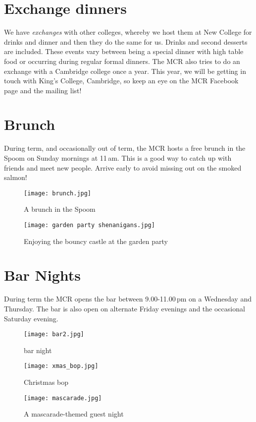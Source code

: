 \section{Exchange dinners}
We have \emph{exchanges} with other colleges, whereby we host them at New
College for drinks and dinner and then they do the same for us. Drinks and second desserts are included. These events vary between being a special dinner with high table food or occurring during regular formal dinners. The MCR also tries to do an exchange with a Cambridge college once a year. This year, we will be getting in touch with King's College, Cambridge, so keep an eye on the MCR Facebook page and the mailing list!

\section{Brunch}
During term, and occasionally out of term, the MCR hosts a free brunch in the
Spoom on Sunday mornings at 11\,am. This is a good way to catch up with friends and meet new people. Arrive early to avoid missing out on the smoked salmon!

\begin{figure}[htbp]
\centering
		\begin{minipage}{0.45\textwidth}
			\centering
				\texttt{[image: brunch.jpg]}
				\caption[]{A brunch in the Spoom}
                \label{fig:brunch}
        \end{minipage}%
        \quad
        \begin{minipage}{0.45\textwidth}
        	\centering
				\texttt{[image: garden party shenanigans.jpg]}
				\caption[]{Enjoying the bouncy castle at the
				garden party}
				\label{fig:eoyp}
        \end{minipage}%
\end{figure}

\section{Bar Nights}
During term the MCR opens the bar between 9.00-11.00\,pm on a Wednesday and
Thursday. The bar is also open on alternate Friday evenings and the occasional Saturday evening.


\begin{figure}[htbp]
\centering
		\begin{minipage}{0.3\textwidth}
				\centering
				\texttt{[image: bar2.jpg]}
				\caption[]{bar night}
				\label{fig:bar}
        \end{minipage}%
        \quad
        \begin{minipage}{0.3\textwidth}
				\centering
				\texttt{[image: xmas\_bop.jpg]}
				\caption[]{Christmas bop}
				\label{fig:bop}
        \end{minipage}%
  \begin{minipage}{0.3\textwidth}
				\centering
				\texttt{[image: mascarade.jpg]}
				\caption[]{A mascarade-themed guest night}
				\label{fig:mascarade}
        \end{minipage}%
\end{figure}

